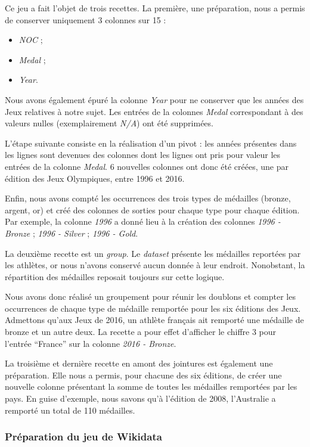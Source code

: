 \documentclass[hidelinks, 12pt]{article}
\begin{document}
Ce jeu a fait l'objet de trois recettes. La première, une préparation, nous a permis de conserver uniquement 3 colonnes sur 15 :
\begin{itemize}
	\item \emph{NOC} ;
	\item \emph{Medal} ;
	\item \emph{Year}.
\end{itemize}
Nous avons également épuré la colonne \emph{Year} pour ne conserver que les années des Jeux relatives à notre sujet. Les entrées de la colonnes \emph{Medal} correspondant à des valeurs nulles (exemplairement \emph{N/A}) ont été supprimées. 

L'étape suivante consiste en la réalisation d'un pivot : les années présentes dans les lignes sont devenues des colonnes dont les lignes ont pris pour valeur les entrées de la colonne \emph{Medal}. 6 nouvelles colonnes ont donc été créées, une par édition des Jeux Olympiques, entre 1996 et 2016.

Enfin, nous avons compté les occurrences des trois types de médailles (bronze, argent, or) et créé des colonnes de sorties pour chaque type pour chaque édition. Par exemple, la colonne \emph{1996} a donné lieu à la création des colonnes \emph{1996 - Bronze} ; \emph{1996 - Silver} ; \emph{1996 - Gold}.

La deuxième recette est un \emph{group}. Le \emph{dataset} présente les médailles reportées par les athlètes, or nous n'avons conservé aucun donnée à leur endroit. Nonobstant, la répartition des médailles reposait toujours sur cette logique.

Nous avons donc réalisé un groupement pour réunir les doublons et compter les occurrences de chaque type de médaille remportée pour les six éditions des Jeux. Admettons qu'aux Jeux de 2016, un athlète français ait remporté une médaille de bronze et un autre deux. La recette a pour effet d'afficher le chiffre 3 pour l'entrée \enquote{France} sur la colonne \emph{2016 - Bronze}.

La troisième et dernière recette en amont des jointures est également une préparation. Elle nous a permis, pour chacune des six éditions, de créer une nouvelle colonne présentant la somme de toutes les médailles remportées par les pays. En guise d'exemple, nous savons qu'à l'édition de 2008, l'Australie a remporté un total de 110 médailles.

\subsubsection{Préparation du jeu de Wikidata}
\end{document}
